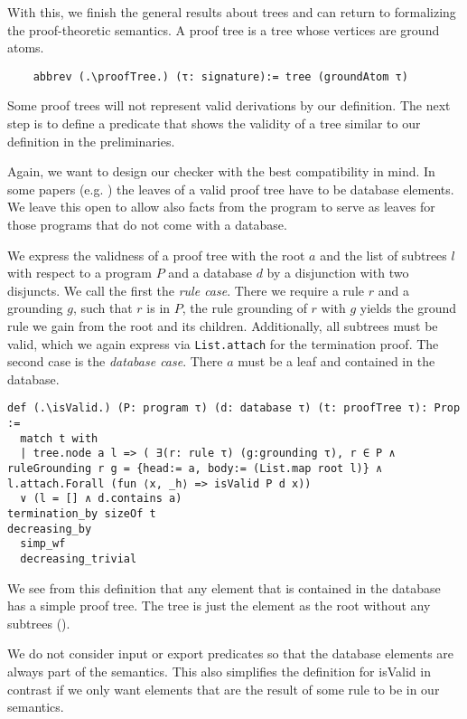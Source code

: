 With this, we finish the general results about trees and can return to formalizing the proof-theoretic semantics. A proof tree is a tree whose vertices are ground atoms.

\begin{lstlisting}
    abbrev (.\proofTree.) (τ: signature):= tree (groundAtom τ)
\end{lstlisting}

Some proof trees will not represent valid derivations by our definition. The next step is to define a predicate that shows the validity of a tree similar to our definition in the preliminaries.

Again, we want to design our checker with the best compatibility in mind. In some papers (e.g. \cite{ComplexityProvDatalog}) the leaves of a valid proof tree have to be database elements. We leave this open to allow also facts from the program to serve as leaves for those programs that do not come with a database.

We express the validness of a proof tree with the root $a$ and the list of subtrees $l$ with respect to a program $P$ and a database $d$ by a disjunction with two disjuncts. We call the first the \textit{rule case}. There we require a rule $r$ and a grounding $g$, such that $r$ is in $P$, the rule grounding of $r$ with $g$ yields the ground rule we gain from the root and its children. Additionally, all subtrees must be valid, which we again express via \lstinline|List.attach| for the termination proof. 
The second case is the \textit{database case}. There $a$ must be a leaf and contained in the database.

\begin{lstlisting}
def (.\isValid.) (P: program τ) (d: database τ) (t: proofTree τ): Prop :=
  match t with
  | tree.node a l => ( ∃(r: rule τ) (g:grounding τ), r ∈ P ∧ ruleGrounding r g = {head:= a, body:= (List.map root l)} ∧ l.attach.Forall (fun ⟨x, _h⟩ => isValid P d x)) 
  ∨ (l = [] ∧ d.contains a)
termination_by sizeOf t
decreasing_by
  simp_wf
  decreasing_trivial
\end{lstlisting}

We see from this definition that any element that is contained in the database has a simple proof tree. The tree is just the element as the root without any subtrees (\databaseElementsHaveValidProofTree). 

We do not consider input or export predicates so that the database elements are always part of the semantics. This also simplifies the definition for isValid in contrast if we only want elements that are the result of some rule to be in our semantics.


